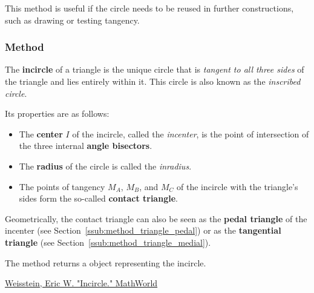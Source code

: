 This method is useful if the circle needs to be reused in further constructions, such as drawing or testing tangency.

\vspace{1em}

\begin{tkzexample}[latex=.5\textwidth]
\begin{center}
\end{center}
\end{tkzexample}

\subsubsection{Method } %
\label{ssub:method_triangle_in_circle}

The \textbf{incircle} of a triangle is the unique circle that is \emph{tangent to all three sides} of the triangle and lies entirely within it. This circle is also known as the \emph{inscribed circle}.

\medskip

Its properties are as follows:
\begin{itemize}
  \item The \textbf{center} $I$ of the incircle, called the \emph{incenter}, is the point of intersection of the three internal \textbf{angle bisectors}.
  \item The \textbf{radius} of the circle is called the \emph{inradius}.
  \item The points of tangency $M_A$, $M_B$, and $M_C$ of the incircle with the triangle's sides form the so-called \textbf{contact triangle}.
\end{itemize}


Geometrically, the contact triangle can also be seen as the \textbf{pedal triangle} of the incenter (see Section~\ref{ssub:method_triangle_pedal}) or as the \textbf{tangential triangle} (see Section~\ref{ssub:method_triangle_medial}).

\medskip

The method  returns a  object representing the incircle.
\begin{flushright}
\small
\href{https://mathworld.wolfram.com/Incircle.html}{Weisstein, Eric W. "Incircle." MathWorld}
\end{flushright}

